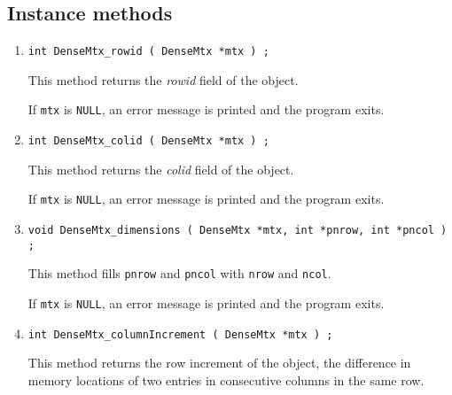 \subsection{Instance methods}
\label{subsection:DenseMtx:proto:instance}
\par
\begin{enumerate}
\item
\begin{verbatim}
int DenseMtx_rowid ( DenseMtx *mtx ) ;
\end{verbatim}
This method returns the {\it rowid} field of the object.
\par {}
If {\tt mtx} is {\tt NULL},
an error message is printed and the program exits.
\item
\begin{verbatim}
int DenseMtx_colid ( DenseMtx *mtx ) ;
\end{verbatim}
This method returns the {\it colid} field of the object.
\par {}
If {\tt mtx} is {\tt NULL},
an error message is printed and the program exits.
\item
\begin{verbatim}
void DenseMtx_dimensions ( DenseMtx *mtx, int *pnrow, int *pncol ) ;
\end{verbatim}
This method 
fills {\tt *pnrow} and {\tt *pncol}
with {\tt nrow} and {\tt ncol}.
\par {}
If {\tt mtx} is {\tt NULL},
an error message is printed and the program exits.
\item
\begin{verbatim}
int DenseMtx_columnIncrement ( DenseMtx *mtx ) ;
\end{verbatim}
This method returns the row increment of the object, the difference
in memory locations of two entries in consecutive columns in the same
row.
\par {}

\end{enumerate}
